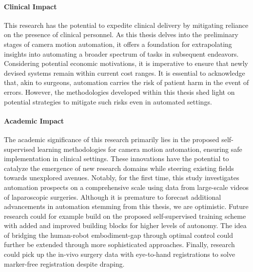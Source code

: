 \paragraph{Clinical Impact} This research has the potential to expedite clinical delivery by mitigating reliance on the presence of clinical personnel. As this thesis delves into the preliminary stages of camera motion automation, it offers a foundation for extrapolating insights into automating a broader spectrum of tasks in subsequent endeavors. Considering potential economic motivations, it is imperative to ensure that newly devised systems remain within current cost ranges. It is essential to acknowledge that, akin to surgeons, automation carries the risk of patient harm in the event of errors. However, the methodologies developed within this thesis shed light on potential strategies to mitigate such risks even in automated settings.

\paragraph{Academic Impact} The academic significance of this research primarily lies in the proposed self-supervised learning methodologies for camera motion automation, ensuring safe implementation in clinical settings. These innovations have the potential to catalyze the emergence of new research domains while steering existing fields towards unexplored avenues. Notably, for the first time, this study investigates automation prospects on a comprehensive scale using data from large-scale videos of laparoscopic surgeries. Although it is premature to forecast additional advancements in automation stemming from this thesis, we are optimistic. Future research could for example build on the proposed self-supervised training scheme with added and improved building blocks for higher levels of autonomy. The idea of bridging the human-robot embodiment-gap through optimal control could further be extended through more sophisticated approaches. Finally, research could pick up the in-vivo surgery data with eye-to-hand registrations to solve marker-free registration despite draping.


